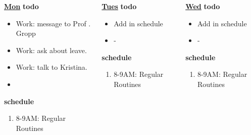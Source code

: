         \begin{columns}
          \begin{column}{0.14\textwidth}{\small \underline{\bf Mon}}
            {\small \bf todo}\\ 
            \begin{itemize}
              \tiny \item \tiny Work: message to Prof . Gropp 
            \item \tiny Work: ask about leave. 
            \item \tiny Work: talk to Kristina. 
            \item \tiny 
            \end{itemize} 
                {\small  \bf schedule}\\
                \begin{enumerate} 
                  \tiny \item \tiny 8-9AM: Regular Routines 
                \end{enumerate}
          \end{column} 
          
          \begin{column}{0.14\textwidth}{\small \underline{\bf Tues}}
            {\small {\bf todo}}\\ 
            \begin{itemize}
              \tiny \item \tiny Add in schedule
            \item \tiny -
            \end{itemize} 
                {\small {\bf schedule}}
                \begin{enumerate} 
                  \tiny \item \tiny 8-9AM: Regular Routines 
                \end{enumerate} 
          \end{column}

          \begin{column}{0.14\textwidth}{\small \underline{\bf Wed}}
            \small{\bf todo}\\
            \begin{itemize}
              \tiny \item \tiny Add in schedule
            \item \tiny -
            \end{itemize} 
                {\small {\bf schedule}}\\
                \begin{enumerate} 
                  \tiny \item \tiny 8-9AM: Regular Routines 
                \end{enumerate} 
          \end{column}


\end{columns}
